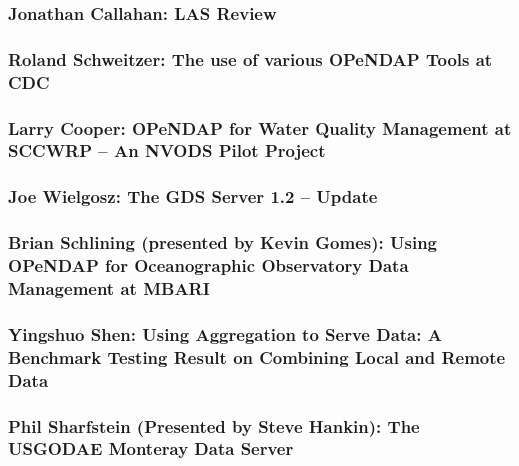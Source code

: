 \subsubsection{Jonathan Callahan: \ac{LAS} Review}
   
\subsubsection{Roland Schweitzer:  The use of various \ac{OPeNDAP} Tools at \ac{CDC}}

\subsubsection{Larry Cooper:  \ac{OPeNDAP} for Water Quality Management at \ac{SCCWRP} --
    An \ac{NVODS} Pilot Project}

\subsubsection{Joe Wielgosz:  The \ac{GDS} Server 1.2 -- Update}


\subsubsection{Brian Schlining (presented by Kevin Gomes): Using OPeNDAP
       for Oceanographic Observatory Data Management at MBARI}


\subsubsection{Yingshuo Shen:  Using Aggregation to Serve Data: A Benchmark
Testing Result on Combining Local and Remote Data}


\subsubsection{Phil Sharfstein (Presented by Steve Hankin):  The \ac{USGODAE} Monteray Data Server}


%
%
%
%

